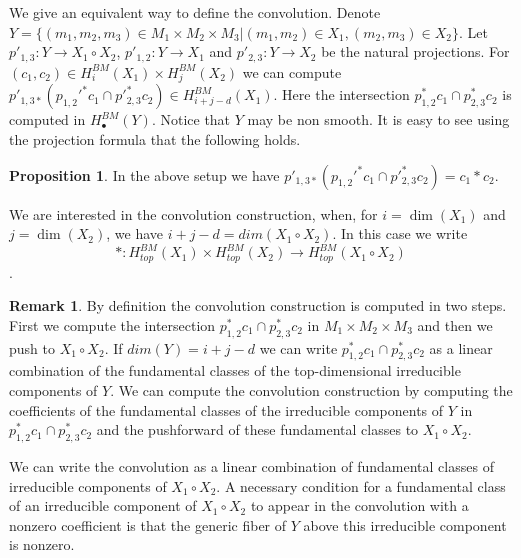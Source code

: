 \documentclass[12pt]{article}
\theoremstyle{plain}
\theoremstyle{definition}
\newtheorem{prop}[theorem]{Proposition}
\newtheorem{Remark}[theorem]{Remark}
\begin{document}
We give an equivalent way to define the convolution. Denote $Y=\{(m_1,m_2,m_3)\in M_1\times M_2\times M_3|(m_1,m_2)\in X_1,(m_2,m_3)\in X_2\}$. Let $p'_{1,3}:Y\rightarrow X_1 \circ X_2$, $p'_{1,2}:Y\rightarrow X_1$ and $p'_{2,3}:Y\rightarrow X_2$ be the natural projections. For $(c_1,c_2)\in H_{i}^{BM}(X_1)\times H_{j}^{BM}(X_2)$ we can compute $p'_{1,3*}(p_{1,2}'^{*}c_1\cap p'^*_{2,3}c_2)\in H_{i+j-d}^{BM}(X_1)$. Here the intersection $p_{1,2}^*c_1\cap p^*_{2,3}c_2$ is computed in $H^{BM}_\bullet(Y)$. Notice that $Y$ may be non smooth. It is easy to see using the projection formula that the following holds.

\begin{prop}\label{alternative convolution}
    In the above setup we have $p'_{1,3*}(p_{1,2}'^*c_1\cap p'^*_{2,3}c_2)=c_1*c_2$.
\end{prop}


We are interested in the convolution construction, when, for $i=\dim(X_1)$ and $j=\dim(X_2)$, we have $i+j-d=dim(X_1\circ X_2)$. In this case we write 
$$*:H_{top}^{BM}(X_1)\times H_{top}^{BM}(X_2)\rightarrow H_{top}^{BM}(X_1\circ X_2)$$.

\begin{Remark}\label{remark: intersection then convolution}
    By definition the convolution construction is computed in two steps. First we compute the intersection $p^*_{1,2}c_1\cap p^*_{2,3}c_2$ in $M_1\times M_2\times M_3$ and then we push to $X_1\circ X_2$. If $dim(Y)=i+j-d$ we can write $p^*_{1,2}c_1\cap p^*_{2,3}c_2$ as a linear combination of the fundamental classes of the top-dimensional irreducible components of $Y$. We can compute the convolution construction by computing the coefficients of the fundamental classes of the irreducible components of $Y$ in $p^*_{1,2}c_1\cap p^*_{2,3}c_2$ and the pushforward of these fundamental classes to $X_1\circ X_2$. 

    We can write the convolution as a linear combination of fundamental classes of irreducible components of $X_1\circ X_2$. A necessary condition for a fundamental class of an irreducible component of $X_1\circ X_2$ to appear in the convolution with a nonzero coefficient is that the generic fiber of $Y$ above this irreducible component is nonzero.
\end{Remark}
\end{document}

